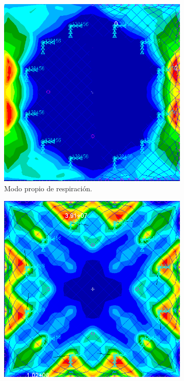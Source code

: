 \begin{figure}[H]  
  \begin{subfigure}[b]{0.5\linewidth}
   \centering
    \includegraphics[width=\linewidth]{Figures/FrecProp.png} 
    \caption{Modo propio de respiración.}
    \label{fig:modopropio}
  \end{subfigure} 
  \begin{subfigure}[b]{0.5\linewidth}
   \centering
    \includegraphics[width=\linewidth]{Figures/StaticZ.png} 

\end{subfigure}
\end{figure}
